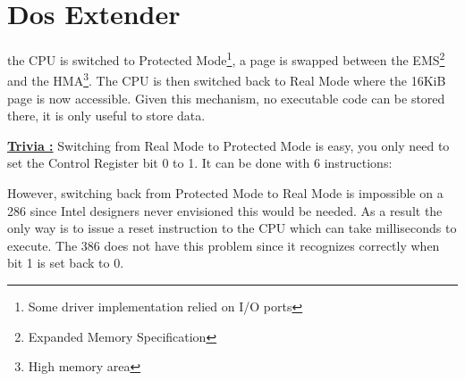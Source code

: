 \section{Dos Extender}

the CPU is switched to Protected Mode\footnote{Some driver implementation relied on I/O ports}, a page is swapped between the EMS\footnote{Expanded Memory Specification} and the HMA\footnote{High memory area}. The CPU is then switched back to Real Mode where the 16KiB page is now accessible. Given this mechanism, no executable code can be stored there, it is only useful to store data.\\
\par
\textbf{\underline{Trivia :}} Switching from Real Mode to Protected Mode is easy, you only need to set the Control Register bit 0 to 1. It can be done with 6 instructions:
\par
{}
\par
However, switching back from Protected Mode to Real Mode is impossible on a 286 since Intel designers never envisioned this would be needed. As a result the only way is to issue a reset instruction  to the CPU which can take milliseconds to execute. The 386 does not have this problem since it recognizes correctly when  bit 1 is set back to 0.